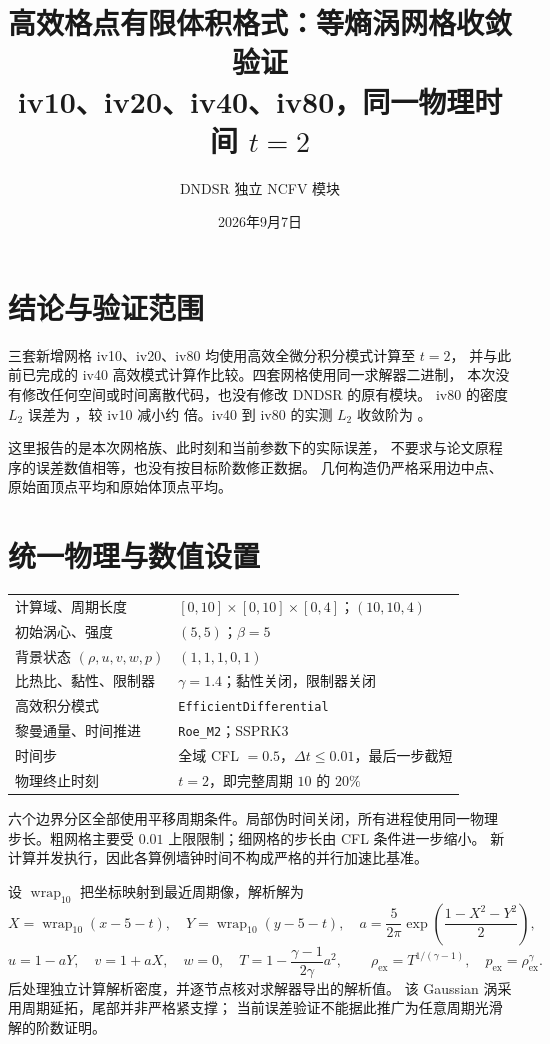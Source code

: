\documentclass[UTF8,fontset=none,11pt,a4paper]{ctexart}
\title{高效格点有限体积格式：等熵涡网格收敛验证\\
       \large iv10、iv20、iv40、iv80，同一物理时间 $t=2$}
\author{DNDSR 独立 NCFV 模块}
\date{2026年9月7日}
\begin{document}
\maketitle

\section{结论与验证范围}
三套新增网格 iv10、iv20、iv80 均使用高效全微分积分模式计算至 $t=2$，
并与此前已完成的 iv40 高效模式计算作比较。四套网格使用同一求解器二进制，
本次没有修改任何空间或时间离散代码，也没有修改 DNDSR 的原有模块。
iv80 的密度 $L_2$ 误差为 \texttt{\FineErrorLtwo}，较 iv10 减小约
\FineReduction{} 倍。iv40 到 iv80 的实测 $L_2$ 收敛阶为
\FineOrderLtwo。

\FineInterpretation{}
这里报告的是本次网格族、此时刻和当前参数下的实际误差，
不要求与论文原程序的误差数值相等，也没有按目标阶数修正数据。
几何构造仍严格采用边中点、原始面顶点平均和原始体顶点平均。

\section{统一物理与数值设置}
\begin{center}
\begin{tabular}{ll}\toprule
计算域、周期长度 & $[0,10]\times[0,10]\times[0,4]$；$(10,10,4)$\\
初始涡心、强度 & $(5,5)$；$\beta=5$\\
背景状态 $(\rho,u,v,w,p)$ & $(1,1,1,0,1)$\\
比热比、黏性、限制器 & $\gamma=1.4$；黏性关闭，限制器关闭\\
高效积分模式 & \texttt{EfficientDifferential}\\
黎曼通量、时间推进 & \texttt{Roe\_M2}；SSPRK3\\
时间步 & 全域 CFL $=0.5$，$\Delta t\le0.01$，最后一步截短\\
物理终止时刻 & $t=2$，即完整周期 $10$ 的 $20\%$\\
\bottomrule\end{tabular}
\end{center}
六个边界分区全部使用平移周期条件。局部伪时间关闭，所有进程使用同一物理
步长。粗网格主要受 $0.01$ 上限限制；细网格的步长由 CFL 条件进一步缩小。
新计算并发执行，因此各算例墙钟时间不构成严格的并行加速比基准。

设 $\operatorname{wrap}_{10}$ 把坐标映射到最近周期像，解析解为
\[
X=\operatorname{wrap}_{10}(x-5-t),\quad
Y=\operatorname{wrap}_{10}(y-5-t),\quad
a=\frac{5}{2\pi}\exp\!\left(\frac{1-X^2-Y^2}{2}\right),
\]
\[
u=1-aY,\quad v=1+aX,\quad w=0,\quad
T=1-\frac{\gamma-1}{2\gamma}a^2,\qquad
\rho_{\mathrm{ex}}=T^{1/(\gamma-1)},\quad p_{\mathrm{ex}}=\rho_{\mathrm{ex}}^\gamma.
\]
后处理独立计算解析密度，并逐节点核对求解器导出的解析值。
该 Gaussian 涡采用周期延拓，尾部并非严格紧支撑；
当前误差验证不能据此推广为任意周期光滑解的阶数证明。
\end{document}
